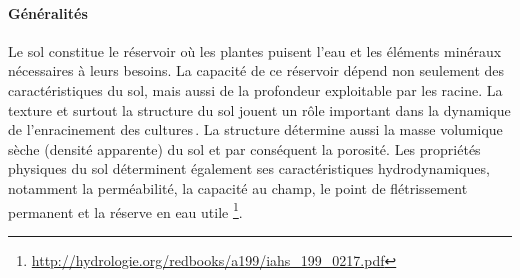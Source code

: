 \documentclass[a4paper,11pt]{article}
\begin{document}
\paragraph{Généralités}

Le sol constitue le réservoir où les plantes puisent l’eau et les
éléments minéraux nécessaires à leurs besoins. La capacité de ce
réservoir dépend non seulement des caractéristiques du sol, mais aussi
de la profondeur exploitable par les racine. La texture et surtout la
structure du sol jouent un rôle important dans la dynamique de
l’enracinement des cultures\,\cite{Chopart_1980}. La structure détermine
aussi la masse volumique sèche (densité apparente) du sol et par
conséquent la porosité. Les propriétés physiques du sol déterminent
également ses caractéristiques hydrodynamiques, notamment la
perméabilité, la capacité au champ, le point de flétrissement
permanent et la réserve en eau utile
\footnote{\url{http://hydrologie.org/redbooks/a199/iahs_199_0217.pdf}}.


\end{document}
